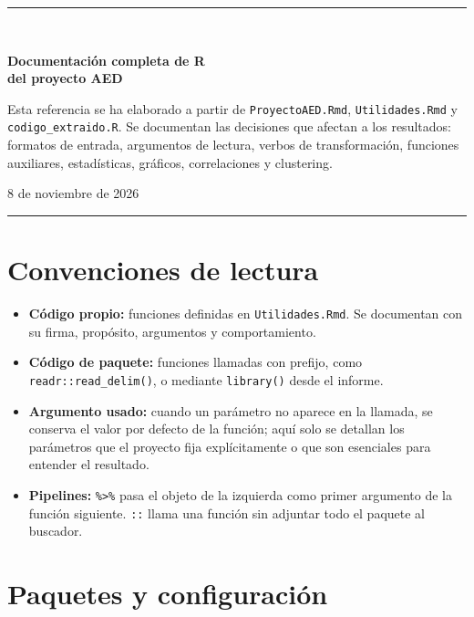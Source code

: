 \documentclass[10pt,a4paper]{article}
\newcommand{\code}[1]{\texttt{\small #1}}
\begin{document}
\begin{titlepage}
\centering\vspace*{1cm}
{\color{azul}\rule{\textwidth}{1.5pt}}\\[0.7cm]
{\Huge\bfseries Documentación completa de R\\[0.15cm] del proyecto AED\par}
\vspace{0.5cm}{\Large Librerías, comandos, funciones y parámetros utilizados\par}
\vspace{1cm}
\begin{minipage}{0.88\textwidth}\small
Esta referencia se ha elaborado a partir de \code{ProyectoAED.Rmd}, \code{Utilidades.Rmd} y \code{codigo\_extraido.R}. Se documentan las decisiones que afectan a los resultados: formatos de entrada, argumentos de lectura, verbos de transformación, funciones auxiliares, estadísticas, gráficos, correlaciones y clustering.
\end{minipage}
\vfill
{\large 8 de noviembre de 2026\par}
{\color{azul}\rule{\textwidth}{1.5pt}}
\end{titlepage}
\tableofcontents\newpage

\section{Convenciones de lectura}
\begin{itemize}[leftmargin=1.4em]
\item \textbf{Código propio:} funciones definidas en \code{Utilidades.Rmd}. Se documentan con su firma, propósito, argumentos y comportamiento.
\item \textbf{Código de paquete:} funciones llamadas con prefijo, como \code{readr::read\_delim()}, o mediante \code{library()} desde el informe.
\item \textbf{Argumento usado:} cuando un parámetro no aparece en la llamada, se conserva el valor por defecto de la función; aquí solo se detallan los parámetros que el proyecto fija explícitamente o que son esenciales para entender el resultado.
\item \textbf{Pipelines:} \code{\%>\%} pasa el objeto de la izquierda como primer argumento de la función siguiente. \code{::} llama una función sin adjuntar todo el paquete al buscador.
\end{itemize}

\section{Paquetes y configuración}
\end{document}

